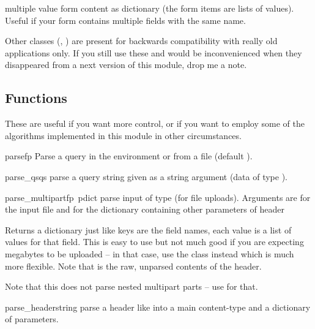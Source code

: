 multiple value form content as dictionary (the form
items are lists of values).  Useful if your form contains multiple
fields with the same name.

Other classes (, ) are present for
backwards compatibility with really old applications only.  If you still 
use these and would be inconvenienced when they disappeared from a next 
version of this module, drop me a note.


\subsection{Functions}

These are useful if you want more control, or if you want to employ
some of the algorithms implemented in this module in other
circumstances.

\begin{funcdesc}{parse}{fp}
Parse a query in the environment or from a file (default ).
\end{funcdesc}

\begin{funcdesc}{parse_qs}{qs}
parse a query string given as a string argument (data of type 
).
\end{funcdesc}

\begin{funcdesc}{parse_multipart}{fp\, pdict}
parse input of type  (for 
file uploads).  Arguments are  for the input file and 
     for the dictionary containing other parameters of  header

    Returns a dictionary just like 
keys are the field names, each 
    value is a list of values for that field.  This is easy to use but not 
    much good if you are expecting megabytes to be uploaded -- in that case, 
    use the  class instead which is much more flexible.  Note 
    that  is the raw, unparsed contents of the  
    header.

    Note that this does not parse nested multipart parts -- use  for 
    that.
\end{funcdesc}

\begin{funcdesc}{parse_header}{string}
parse a header like  into a main
content-type and a dictionary of parameters.
\end{funcdesc}

